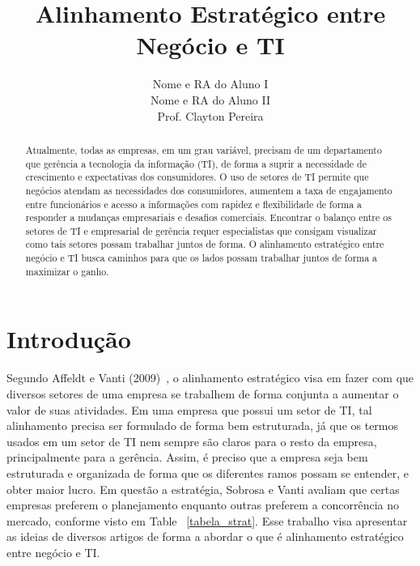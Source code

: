 \documentclass[review]{elsarticle}
\begin{document}
\begin{abstract}

Atualmente, todas as empresas, em um grau variável, precisam de um departamento que gerência a tecnologia da informação (TI), de forma a suprir a necessidade de crescimento e expectativas dos consumidores. O uso de setores de TI permite que negócios atendam as necessidades dos consumidores, aumentem a taxa de engajamento entre funcionários e acesso a informações com rapidez e flexibilidade de forma a responder a mudanças empresariais e desafios comerciais. Encontrar o balanço entre os setores de TI e empresarial de gerência requer especialistas que consigam visualizar como tais setores possam trabalhar juntos de forma. O alinhamento estratégico entre negócio e TI busca caminhos para que os lados possam trabalhar juntos de forma a maximizar o ganho.~\cite{Edmead2016,wikibit2018}


\end{abstract}

\title{Alinhamento Estratégico entre Negócio e TI}


\author{Nome e RA do Aluno I \\ Nome e RA do Aluno II \\ Prof. Clayton Pereira}%


\maketitle


\section{Introdução}
Segundo Affeldt e Vanti (2009)~\cite{Sobrosa2009}, o alinhamento estratégico visa em fazer com que diversos setores de uma empresa se trabalhem de forma conjunta a aumentar o valor de suas atividades. Em uma empresa que possui um setor de TI, tal alinhamento precisa ser formulado de forma bem estruturada, já que os termos usados em um setor de TI nem sempre são claros para o resto da empresa, principalmente para a gerência. Assim, é preciso que a empresa seja bem estruturada e organizada de forma que os diferentes ramos possam se entender, e obter maior lucro. Em questão a estratégia, Sobrosa e Vanti avaliam que certas empresas preferem o planejamento enquanto outras preferem a concorrência no mercado, conforme visto em Table ~\ref{tabela_strat}. Esse trabalho visa apresentar as ideias de diversos artigos de forma a abordar o que é alinhamento estratégico entre negócio e TI.
\end{document}
